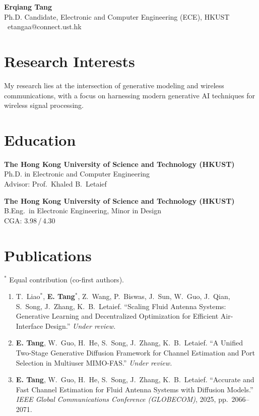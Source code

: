 \documentclass[10pt,a4paper]{article}
\newcommand{\me}{\textbf{E. Tang}}
\newcommand{\entry}[2]{%
  \noindent\begin{minipage}[t]{0.78\textwidth}#1\end{minipage}%
  \hfill\begin{minipage}[t]{0.20\textwidth}\raggedleft{\color{muted}\small #2}\end{minipage}\par}
\begin{document}
{\huge\bfseries Erqiang Tang}\\[6pt]
{\color{muted}Ph.D. Candidate, Electronic and Computer Engineering (ECE), HKUST}\\[6pt]
{\small
\faEnvelope\ etangaa@connect.ust.hk
}

\section{Research Interests}
My research lies at the intersection of generative modeling and wireless communications,
with a focus on harnessing modern generative AI techniques for wireless signal processing.

\section{Education}
\entry{%
  \textbf{The Hong Kong University of Science and Technology (HKUST)}\\
  Ph.D. in Electronic and Computer Engineering\\
  {\color{muted}\small Advisor: Prof.\ Khaled B.\ Letaief}%
}{2022 -- Present}
\vspace{6pt}
\entry{%
  \textbf{The Hong Kong University of Science and Technology (HKUST)}\\
  B.Eng.\ in Electronic Engineering, Minor in Design\\
  {\color{muted}\small CGA: 3.98\,/\,4.30}%
}{2018 -- 2022}

\section{Publications}
{\color{muted}\small $^{*}$ Equal contribution (co-first authors).}
\begin{enumerate}[leftmargin=1.4em, label=\arabic*., itemsep=6pt]
  \item T.\ Liao$^{*}$, \me$^{*}$, Z.\ Wang, P.\ Biswas, J.\ Sun, W.\ Guo, J.\ Qian, S.\ Song,
        J.\ Zhang, K.\ B.\ Letaief.
        ``Scaling Fluid Antenna Systems: Generative Learning and Decentralized Optimization
        for Efficient Air-Interface Design.''
        \textit{Under review.}
  \item \me, W.\ Guo, H.\ He, S.\ Song, J.\ Zhang, K.\ B.\ Letaief.
        ``A Unified Two-Stage Generative Diffusion Framework for Channel Estimation and Port
        Selection in Multiuser MIMO-FAS.''
        \textit{Under review.}
  \item \me, W.\ Guo, H.\ He, S.\ Song, J.\ Zhang, K.\ B.\ Letaief.
        ``Accurate and Fast Channel Estimation for Fluid Antenna Systems with Diffusion Models.''
        \textit{IEEE Global Communications Conference (GLOBECOM)}, 2025, pp.\ 2066--2071.
\end{enumerate}
\end{document}
